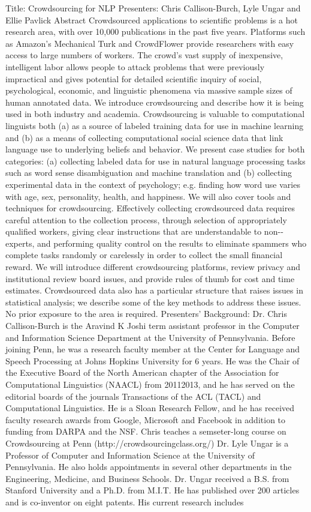 Title: Crowdsourcing for NLP Presenters: Chris Callison-Burch, Lyle Ungar and Ellie Pavlick Abstract Crowdsourced applications to scientific problems is a hot research area, with over 10,000 publications in the past five years. Platforms such as Amazon's Mechanical Turk and CrowdFlower provide researchers with easy access to large numbers of workers. The crowd's vast supply of inexpensive, intelligent labor allows people to attack problems that were previously impractical and gives potential for detailed scientific inquiry of social, psychological, economic, and linguistic phenomena via massive sample sizes of human annotated data. We introduce crowdsourcing and describe how it is being used in both industry and academia. Crowdsourcing is valuable to computational linguists both (a) as a source of labeled training data for use in machine learning and (b) as a means of collecting computational social science data that link language use to underlying beliefs and behavior. We present case studies for both categories: (a) collecting labeled data for use in natural language processing tasks such as word sense disambiguation and machine translation and (b) collecting experimental data in the context of psychology; e.g. finding how word use varies with age, sex, personality, health, and happiness. We will also cover tools and techniques for crowdsourcing. Effectively collecting crowdsourced data requires careful attention to the collection process, through selection of appropriately qualified workers, giving clear instructions that are understandable to non-­experts, and performing quality control on the results to eliminate spammers who complete tasks randomly or carelessly in order to collect the small financial reward. We will introduce different crowdsourcing platforms, review privacy and institutional review board issues, and provide rules of thumb for cost and time estimates. Crowdsourced data also has a particular structure that raises issues in statistical analysis; we describe some of the key methods to address these issues. No prior exposure to the area is required. Presenters' Background: Dr. Chris Callison-Burch is the Aravind K Joshi term assistant professor in the Computer and Information Science Department at the University of Pennsylvania. Before joining Penn, he was a research faculty member at the Center for Language and Speech Processing at Johns Hopkins University for 6 years. He was the Chair of the Executive Board of the North American chapter of the Association for Computational Linguistics (NAACL) from 2011­2013, and he has served on the editorial boards of the journals Transactions of the ACL (TACL) and Computational Linguistics. He is a Sloan Research Fellow, and he has received faculty research awards from Google, Microsoft and Facebook in addition to funding from DARPA and the NSF. Chris teaches a semseter-long course on Crowdsourcing at Penn (http://crowdsourcing­class.org/) Dr. Lyle Ungar is a Professor of Computer and Information Science at the University of Pennsylvania. He also holds appointments in several other departments in the Engineering, Medicine, and Business Schools. Dr. Ungar received a B.S. from Stanford University and a Ph.D. from M.I.T. He has published over 200 articles and is co-inventor on eight patents. His current research includes 